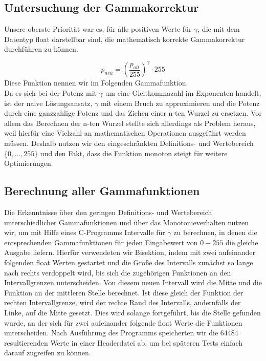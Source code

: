 \documentclass[course=erap]{aspdoc}
\begin{document}
	\subsection{Untersuchung der Gammakorrektur}
	Unsere oberste Priorität war es, für alle positiven Werte für $\gamma$, die mit dem Datentyp float darstellbar sind, die mathematisch korrekte Gammakorrektur durchführen zu können.

	\begin{equation}
	p_{neu} = \left(\frac{p_{alt}}{255}\right)^{\gamma} \cdot 255
	\end{equation}
	Diese Funktion nennen wir im Folgenden Gammafunktion.\\

	\noindent Da es sich bei der Potenz mit $\gamma$ um eine Gleitkommazahl im Exponenten handelt, ist der naive Lösungsansatz, $\gamma$ mit einem Bruch zu approximieren und die Potenz durch eine ganzzahlige Potenz und das Ziehen einer n-ten Wurzel zu ersetzen.
	Vor allem das Berechnen der n-ten Wurzel stellte sich allerdings als Problem heraus, weil hierfür eine Vielzahl an mathematischen Operationen ausgeführt werden müssen. Deshalb nutzen wir den eingeschränkten Definitions- und Wertebereich $\{0,...,255\}$ und den Fakt, dass die Funktion monoton steigt für weitere Optimierungen.

	\subsection{Berechnung aller Gammafunktionen}
	Die Erkenntnisse über den geringen Definitions- und Wertebereich unterschiedlicher Gammafunktionen und über das Monotonieverhalten nutzen wir, um mit Hilfe eines C-Programms Intervalle für $\gamma$ zu berechnen, in denen die entsprechenden Gammafunktionen für jeden Eingabewert von $0-255$ die gleiche Ausgabe liefern. Hierfür verwendeten wir Bisektion, indem mit zwei aufeinander folgenden float Werten gestartet und die Größe des Intervalls zunächst so lange nach rechts verdoppelt wird, bis sich die zugehörigen Funktionen an den Intervallgrenzen unterscheiden. Von diesem neuen Intervall wird die Mitte und die Funktion an der mittleren Stelle berechnet. Ist diese gleich der Funktion der rechten Intervallgrenze, wird der rechte Rand des Intervalls, andernfalls der Linke, auf die Mitte gesetzt. Dies wird solange fortgeführt, bis die Stelle gefunden wurde, an der sich für zwei aufeinander folgende float Werte die Funktionen unterscheiden. Nach Ausführung des Programms speicherten wir die 64484 resultierenden Werte in einer Headerdatei ab, um bei späteren Tests einfach darauf zugreifen zu können.
\end{document}

